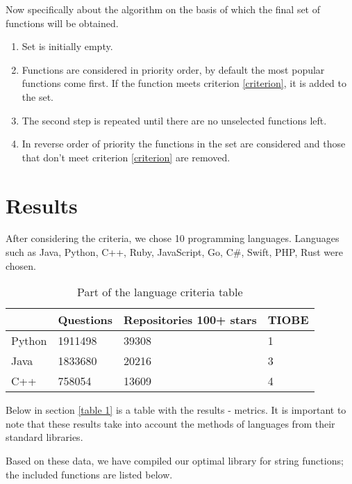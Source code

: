 \documentclass[anonymous,sigplan,review,11pt,nonacm,natbib=false]{acmart}
\begin{document}
    Now specifically about the algorithm on the basis of which the final set of functions will be obtained.

    \begin{enumerate}
        \item Set is initially empty.
        \item Functions are considered in priority order, by default the most popular functions come first. If the function meets criterion \ref{criterion}, it is added to the set.
        \item The second step is repeated until there are no unselected functions left.
        \item In reverse order of priority the functions in the set are considered and those that don't meet criterion \ref{criterion} are removed.
    \end{enumerate}

    \section{Results}

    After considering the criteria, we chose 10 programming languages. Languages such as Java, Python, C++, Ruby, JavaScript, Go, C\#, Swift, PHP, Rust were chosen.


    \begin{table}[h]
        \begin{tabular}{llll}
            \hline
            & Questions
            & Repositories 100+ stars
            & TIOBE
            \\ \hline

            Python & 1911498 & 39308 & 1 \\

            Java & 1833680 & 20216 & 3 \\

            C++ & 758054 & 13609 & 4 \\ \hline
        \end{tabular}
        \caption{Part of the language criteria table}
    \end{table}

    Below in section \ref{table 1} is a table with the results - metrics. It is important to note that these results take into account the methods of languages from their standard libraries.

    Based on these data, we have compiled our optimal library for string functions; the included functions are listed below.
\end{document}
